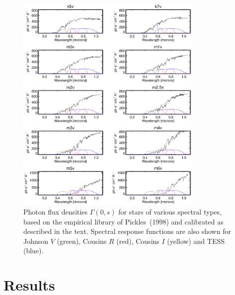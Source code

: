 \documentclass[preprint,10pt]{aastex}
\begin{document}
\begin{figure}
\begin{center}
\includegraphics[width=0.8\textwidth]{pickles2.eps}
\end{center}
\caption{Photon flux densities $\Gamma(0,s)$ for stars of various
spectral types, based on the empirical library of Pickles~(1998) and
calibrated as described in the text. Spectral response functions are also shown
for Johnson $V$ (green), Cousins $R$ (red), Cousins $I$ (yellow)
and TESS (blue).}
\label{fig:pickles2}
\end{figure}

\section{Results}
\end{document}
